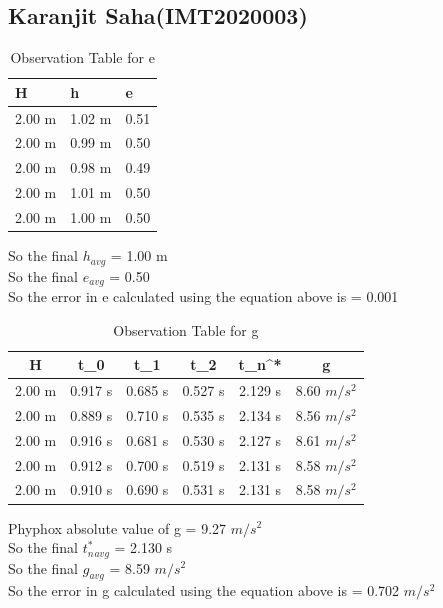 \documentclass[11pt]{scrartcl} %
\begin{document}
\newpage
\subsection{Karanjit Saha(IMT2020003)}

\begin{table}[h] %
	\centering %
	\begin{tabular}{l l l}
		\toprule
		\textbf{H} & \textbf{h} & \textbf{e} \\
		\midrule
		2.00 m & 1.02 m & 0.51\\
		2.00 m & 0.99 m  & 0.50\\
		2.00 m & 0.98 m  & 0.49\\
		2.00 m & 1.01 m & 0.50 \\
		2.00 m & 1.00 m & 0.50 \\
		\bottomrule
	\end{tabular}
	\caption{Observation Table for e}
\end{table}
So the final $h_{avg}$ = 1.00 m\\
So the final $e_{avg}$ = 0.50\\
So the error in e calculated using the equation above is  = 0.001 

\begin{table}[h]
\centering
\begin{tabular}{||c c c c c c||} 
\toprule
 \hline
 H & t_0 & t_1 & t_2 & t_n^* & g \\ [0.5ex] 
 \midrule
 \hline\hline
 2.00 m & 0.917 s & 0.685 s  & 0.527 s & 2.129 s & 8.60 $m/s^2$  \\ 
 \hline
 2.00 m & 0.889 s & 0.710 s & 0.535 s & 2.134 s & 8.56 $m/s^2$  \\
 \hline
 2.00 m & 0.916 s & 0.681 s & 0.530 s & 2.127 s  & 8.61 $m/s^2$   \\
 \hline
 2.00 m & 0.912 s & 0.700 s & 0.519 s & 2.131 s  & 8.58 $m/s^2$   \\
 \hline
 2.00 m & 0.910 s & 0.690 s & 0.531 s & 2.131 s  & 8.58 $m/s^2$  \\ [1ex] 
 \bottomrule
 \hline
\end{tabular}
\caption{Observation Table for g}
\end{table}
Phyphox absolute value of g = 9.27 $m/s^2$\\
So the final $t_n^*_{avg}$ = 2.130 s\\
So the final $g_{avg}$ = 8.59 $m/s^2$\\
So the error in g calculated using the equation above is  = 0.702 $m/s^2$
\end{document}

